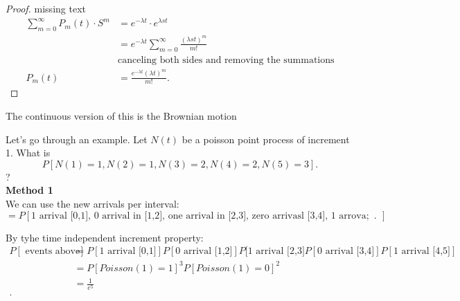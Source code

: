 \documentclass[a4paper]{article}
\begin{document}
\begin{proof}
     missing text \\

     \begin{align*}
       \sum_{m = 0}^{\infty} P_m (t) \cdot S^{m} &= e^{-\lambda t} \cdot e^{\lambda s t} \\
       &= e^{-\lambda t} \sum_{m=0}^{\infty} \frac{\left( \lambda s t \right)^{m} }{m!} \\
      &\text{canceling both sides and removing the summations} \\
      P_m (t) &= \frac{e^{-\lambda t} (\lambda t)^{m}}{m!}  
     .\end{align*}
  \end{proof}

\begin{note}
  The continuous version of this is the Brownian motion
\end{note}

\noindent\hrulefill

Let's go through an example. Let $N(t)$ be a poisson point process of increment 1. What is
 \[
   P[N(1) = 1, N(2) = 1, N(3) = 2, N(4) = 2, N(5) = 3] 
.\]?\\

\textbf{Method 1}\\
We can use the new arrivals per interval:
\[
  = P[\text{1 arrival [0,1], 0 arrival in [1,2], one arrival in [2,3], zero arrivasl [3,4], 1 arrova; [4,5]}]
.\] 

By tyhe time independent increment property:
\begin{align*}
  P[\text{ events above}] &= P[\text{1 arrival [0,1]}]P[\text{0 arrival [1,2]}] P[\text{1 arrival [2,3]} P[\text{0 arrival [3,4]}] P[\text{1 arrival [4,5]}] \\
                          &= P[Poisson(1) = 1]^{3} P[Poisson(1) = 0]^{2} \\
                          &= \frac{1}{e^{5}} \\
.\end{align*}
\end{document}
